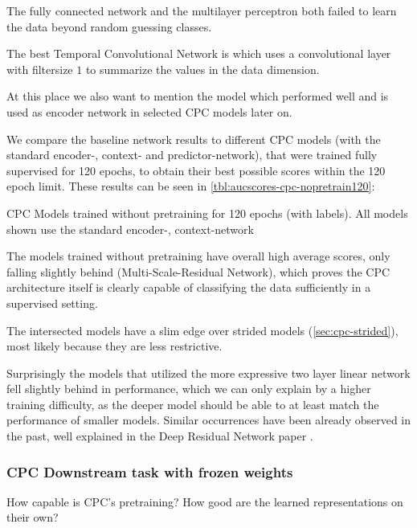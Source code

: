 The fully connected network  and the multilayer perceptron  both failed to learn the data beyond random guessing classes. 

The best Temporal Convolutional Network is  which uses a convolutional layer with filtersize $1$ to summarize the values in the data dimension. 

At this place we also want to mention the  model which performed well and is used as encoder network in selected CPC models later on.

We compare the baseline network results to different CPC models (with the standard encoder-, context- and predictor-network), that were trained fully supervised for 120 epochs, to obtain their best possible scores within the 120 epoch limit. These results can be seen in \autoref{tbl:aucscores-cpc-nopretrain120}:
\begin{table}\centering
	\resizebox{\textwidth}{!}{	
		
	}
	\caption*{\small CPC Models trained without pretraining for 120 epochs (with labels). All models shown use the standard encoder-, context-network}
	\label{tbl:aucscores-cpc-nopretrain120}
\end{table}
The models trained without pretraining have overall high average scores, only falling slightly behind  (Multi-Scale-Residual Network), which proves the CPC architecture itself is clearly capable of classifying the data sufficiently in a supervised setting. 

The intersected models have a slim edge over strided models (\autoref{sec:cpc-strided}), most likely because they are less restrictive.

Surprisingly the models that utilized the more expressive two layer linear network fell slightly behind in performance, which we can only explain by a higher training difficulty, as the deeper model should be able to at least match the performance of smaller models. Similar occurrences have been already observed in the past, well explained in the Deep Residual Network paper \autocite{he2015deep}.

\subsubsection{CPC Downstream task with frozen weights}
How capable is CPC's pretraining? How good are the learned representations on their own? 

